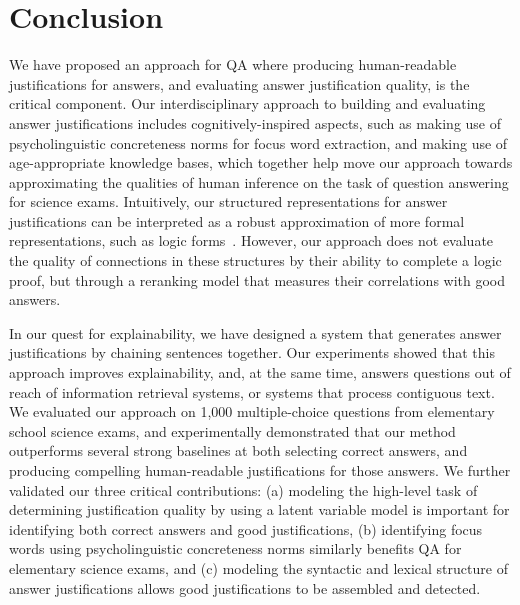\section{Conclusion}
\label{sec-cl2017:conclusion}

We have proposed an approach for QA where producing human-readable justifications for answers, and evaluating answer justification quality, is the critical component.
Our interdisciplinary approach to building and evaluating answer justifications includes cognitively-inspired aspects, such as making use of psycholinguistic concreteness norms for focus word extraction, and making use of age-appropriate knowledge bases, which together help move our approach towards approximating the qualities of human inference on the task of question answering for science exams. Intuitively, our structured representations for answer justifications can be interpreted as a robust approximation of more formal representations, such as logic forms~\cite{moldovan2001logic}. However, our approach does not evaluate the quality of connections in these structures by their ability to complete a logic proof, but through a reranking model that measures their correlations with good answers.

In our quest for explainability, we have designed a system that generates answer justifications by chaining sentences together. Our experiments showed that this approach improves explainability, and, at the same time, answers questions out of reach of information retrieval systems, or systems that process contiguous text.  
We evaluated our approach on 1,000 multiple-choice questions from elementary school science exams, and experimentally demonstrated that our method outperforms several strong baselines at both selecting correct answers, and producing compelling human-readable justifications for those answers.  We further validated our three critical contributions: (a) modeling the high-level task of determining justification quality by using a latent variable model is important for identifying both correct answers and good justifications, (b) identifying focus words using psycholinguistic concreteness norms similarly benefits QA for elementary science exams, and (c) modeling the syntactic and lexical structure of answer justifications allows good justifications to be assembled and detected. 

